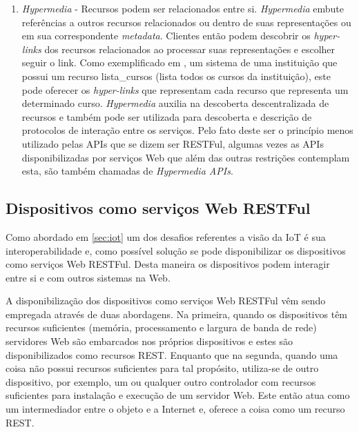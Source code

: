 \begin{enumerate}
\item \textit{Hypermedia} - Recursos podem ser relacionados entre si. \textit{Hypermedia} embute referências a outros recursos relacionados ou dentro de suas representações ou em sua correspondente \textit{metadata}. Clientes então podem descobrir os \textit{hyper-links} dos recursos relacionados ao processar suas representações e escolher seguir o link. Como exemplificado em \cite{Franca:2011}, um sistema de uma instituição que possui um recurso lista\_cursos (lista todos os cursos da instituição), este pode oferecer os \textit{hyper-links} que representam cada recurso que representa um determinado curso. \textit{Hypermedia} auxilia na descoberta descentralizada de recursos e também pode ser utilizada para descoberta e descrição de protocolos de interação entre os serviços. Pelo fato deste ser o princípio menos utilizado pelas APIs que se dizem ser RESTFul, algumas vezes as APIs disponibilizadas por serviços Web que além das outras restrições contemplam esta, são também chamadas de \textit{Hypermedia APIs}.\cite{Pautasso:2014}
\end{enumerate}

\subsection{Dispositivos como serviços Web RESTFul} 
\label{subsec:dispositivosWeb}
Como abordado em \ref{sec:iot} um dos desafios referentes a visão da IoT é sua interoperabilidade e, como possível solução se pode disponibilizar os dispositivos como serviços Web RESTFul. Desta maneira os dispositivos podem interagir entre si e com outros sistemas na Web.

A disponibilização dos dispositivos como serviços Web RESTFul vêm sendo empregada através de duas abordagens. Na primeira, quando os dispositivos têm recursos suficientes (memória, processamento e largura de banda de rede) servidores Web são embarcados nos próprios dispositivos e estes são disponibilizados como recursos REST. Enquanto que na segunda, quando uma coisa não possui recursos suficientes para tal propósito, utiliza-se de outro dispositivo, por exemplo, um  ou qualquer outro controlador com recursos suficientes para instalação e execução de um servidor Web. Este então atua como um intermediador entre o objeto e a Internet e, oferece a coisa como um recurso REST.\cite{Franca:2011}

